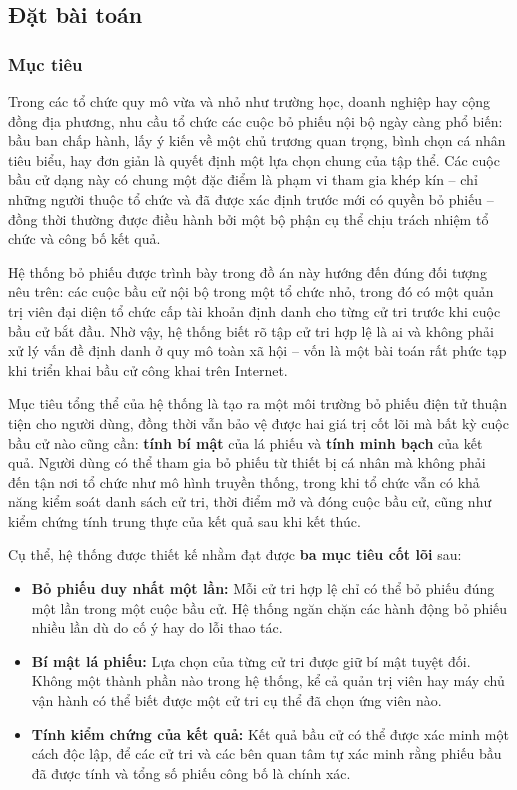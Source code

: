 \subsection{Đặt bài toán}

\subsubsection{Mục tiêu}

Trong các tổ chức quy mô vừa và nhỏ như trường học, doanh nghiệp hay cộng đồng địa phương, nhu cầu tổ chức các cuộc bỏ phiếu nội bộ ngày càng phổ biến: bầu ban chấp hành, lấy ý kiến về một chủ trương quan trọng, bình chọn cá nhân tiêu biểu, hay đơn giản là quyết định một lựa chọn chung của tập thể. Các cuộc bầu cử dạng này có chung một đặc điểm là phạm vi tham gia khép kín -- chỉ những người thuộc tổ chức và đã được xác định trước mới có quyền bỏ phiếu -- đồng thời thường được điều hành bởi một bộ phận cụ thể chịu trách nhiệm tổ chức và công bố kết quả.

Hệ thống bỏ phiếu được trình bày trong đồ án này hướng đến đúng đối tượng nêu trên: các cuộc bầu cử nội bộ trong một tổ chức nhỏ, trong đó có một quản trị viên đại diện tổ chức cấp tài khoản định danh cho từng cử tri trước khi cuộc bầu cử bắt đầu. Nhờ vậy, hệ thống biết rõ tập cử tri hợp lệ là ai và không phải xử lý vấn đề định danh ở quy mô toàn xã hội -- vốn là một bài toán rất phức tạp khi triển khai bầu cử công khai trên Internet.

Mục tiêu tổng thể của hệ thống là tạo ra một môi trường bỏ phiếu điện tử thuận tiện cho người dùng, đồng thời vẫn bảo vệ được hai giá trị cốt lõi mà bất kỳ cuộc bầu cử nào cũng cần: \textbf{tính bí mật} của lá phiếu và \textbf{tính minh bạch} của kết quả. Người dùng có thể tham gia bỏ phiếu từ thiết bị cá nhân mà không phải đến tận nơi tổ chức như mô hình truyền thống, trong khi tổ chức vẫn có khả năng kiểm soát danh sách cử tri, thời điểm mở và đóng cuộc bầu cử, cũng như kiểm chứng tính trung thực của kết quả sau khi kết thúc.

Cụ thể, hệ thống được thiết kế nhằm đạt được \textbf{ba mục tiêu cốt lõi} sau:

\begin{itemize}
    \item \textbf{Bỏ phiếu duy nhất một lần:} Mỗi cử tri hợp lệ chỉ có thể bỏ phiếu đúng một lần trong một cuộc bầu cử. Hệ thống ngăn chặn các hành động bỏ phiếu nhiều lần dù do cố ý hay do lỗi thao tác.

    \item \textbf{Bí mật lá phiếu:} Lựa chọn của từng cử tri được giữ bí mật tuyệt đối. Không một thành phần nào trong hệ thống, kể cả quản trị viên hay máy chủ vận hành có thể biết được một cử tri cụ thể đã chọn ứng viên nào.

    \item \textbf{Tính kiểm chứng của kết quả:} Kết quả bầu cử có thể được xác minh một cách độc lập, để các cử tri và các bên quan tâm tự xác minh rằng phiếu bầu đã được tính và tổng số phiếu công bố là chính xác.
\end{itemize}


